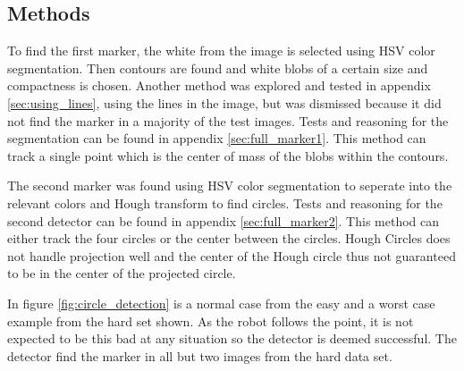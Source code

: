 \subsection{Methods}
To find the first marker, the white from the image is selected using HSV color segmentation.
Then contours are found and white blobs of a certain size and compactness is chosen.
Another method was explored and tested in appendix \ref{sec:using_lines}, using the lines in the image, but was dismissed because it did not find the marker in a majority of the test images.
Tests and reasoning for the segmentation can be found in appendix \ref{sec:full_marker1}.
This method can track a single point which is the center of mass of the blobs within the contours.

The second marker was found using HSV color segmentation to seperate into the relevant colors and Hough transform to find circles.
Tests and reasoning for the second detector can be found in appendix \ref{sec:full_marker2}.
This method can either track the four circles or the center between the circles.
Hough Circles does not handle projection well and the center of the Hough circle thus not guaranteed to be in the center of the projected circle.

In figure \ref{fig:circle_detection} is a normal case from the easy and a worst case example from the hard set shown.
As the robot follows the point, it is not expected to be this bad at any situation so the detector is deemed successful.
The detector find the marker in all but two images from the hard data set.

